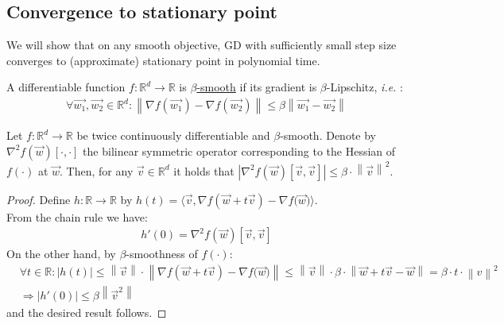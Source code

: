 \documentclass[12pt]{article}
\newcommand{\norm}[1]{\left\| #1 \right\|}
\newcommand{\ie}{{\it i.e. }}
\begin{document}
    \subsection{Convergence to stationary point}
    We will show that on any smooth objective, GD with sufficiently small step size converges to (approximate) stationary point in polynomial time.
	\begin{definition}
	\label{def:beta smooth function}				
		A differentiable function $f:\mathbb{R}^d\to\mathbb{R}$ is \underline{$\beta$-smooth} if its gradient is $\beta$-Lipschitz, \ie:
		\begin{align*}
		    \forall\overrightarrow{w_1},\overrightarrow{w_2}\in\mathbb{R}^d:\norm{\nabla{f(\overrightarrow{w_1})}-\nabla{f(\overrightarrow{w_2})}}\leq \beta \norm{\overrightarrow{w_1}-\overrightarrow{w_2}}
	    \end{align*}
	\end{definition}
	\begin{lemma}
	\label{lem:twice continuously differentiable beta-smooth functions property 1}
		Let $f:\mathbb{R}^d\to\mathbb{R}$ be twice continuously differentiable and $\beta$-smooth. Denote by $\nabla^2f(\overrightarrow{w})[\cdot,\cdot]$ the bilinear symmetric operator corresponding to the Hessian of $f(\cdot)$ at $\overrightarrow{w}$. Then, for any $\overrightarrow{v}\in\mathbb{R}^d$ it holds that $|\nabla^2f(\overrightarrow{w})[\overrightarrow{v},\overrightarrow{v}]|\leq\beta\cdot\norm{\overrightarrow{v}}^2$.
	\end{lemma}
	\begin{proof}
	    Define $h:\mathbb{R}\to\mathbb{R}$ by $h(t)=\langle\overrightarrow{v},\nabla{f(\overrightarrow{w}+t\overrightarrow{v})}-\nabla{f(\overrightarrow{w}})\rangle$.
	    \\From the chain rule we have:
		\begin{align*}
		    h'(0) = \nabla^2f(\overrightarrow{w})[\overrightarrow{v},\overrightarrow{v}]
	    \end{align*}
	    On the other hand, by $\beta$-smoothness of $f(\cdot)$:
		\begin{align*}
		    & \forall t\in\mathbb{R}: |h(t)| \leq \norm{\overrightarrow{v}}\cdot\norm{\nabla{f(\overrightarrow{w}+t\overrightarrow{v})}-\nabla{f(\overrightarrow{w}})} \leq \norm{\overrightarrow{v}} \cdot \beta \cdot \norm{\overrightarrow{w}+t\overrightarrow{v} - \overrightarrow{w}} = \beta \cdot t \cdot \norm{v}^2\\
		    & \Longrightarrow |h'(0)| \leq \beta \norm{\overrightarrow{v}^2}
	    \end{align*}
	    and the desired result follows.
	\end{proof}
\end{document}
